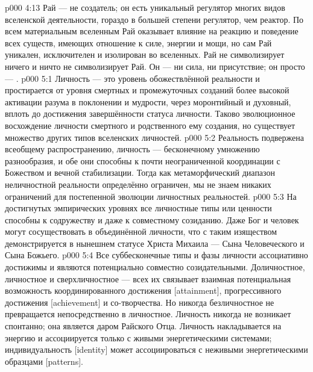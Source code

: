 \vs p000 4:13 Рай --- не создатель; он есть уникальный регулятор многих видов вселенской деятельности, гораздо в большей степени регулятор, чем реактор. По всем материальным вселенным Рай оказывает влияние на реакцию и поведение всех существ, имеющих отношение к силе, энергии и мощи, но сам Рай уникален, исключителен и изолирован во вселенных. Рай не символизирует ничего и ничто не символизирует Рай. Он --- ни сила, ни присутствие; он просто --- .
\vs p000 5:1 Личность --- это уровень обожествлённой реальности и простирается от уровня смертных и промежуточных созданий более высокой активации разума в поклонении и мудрости, через моронтийный и духовный, вплоть до достижения завершённости статуса личности. Таково эволюционное восхождение личности смертного и родственного ему создания, но существует множество других типов вселенских личностей.
\vs p000 5:2 Реальность подвержена всеобщему распространению, личность --- бесконечному умножению разнообразия, и обе они способны к почти неограниченной координации с Божеством и вечной стабилизации. Тогда как метаморфический диапазон неличностной реальности определённо ограничен, мы не знаем никаких ограничений для постепенной эволюции личностных реальностей.
\vs p000 5:3 На достигнутых эмпирических уровнях все личностные типы или ценности способны к содружеству и даже к совместному созиданию. Даже Бог и человек могут сосуществовать в объединённой личности, что с таким изяществом демонстрируется в нынешнем статусе Христа Михаила --- Сына Человеческого и Сына Божьего.
\vs p000 5:4 Все суббесконечные типы и фазы личности ассоциативно достижимы и являются потенциально совместно созидательными. Доличностное, личностное и сверхличностное --- всех их связывает взаимная потенциальная возможность координированного достижения [attainment], прогрессивного достижения [achievement] и со\hyp{}творчества. Но никогда безличностное не превращается непосредственно в личностное. Личность никогда не возникает спонтанно; она является даром Райского Отца. Личность накладывается на энергию и ассоциируется только с живыми энергетическими системами; индивидуальность [identity] может ассоциироваться с неживыми энергетическими образцами [patterns].
